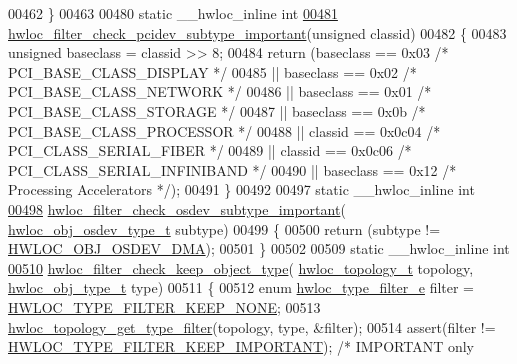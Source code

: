 \begin{DoxyCode}
{00462 \}
00463 
00480 \textcolor{keyword}{static} \_\_hwloc\_inline \textcolor{keywordtype}{int}
\hyperlink{a00231_ga60203db6459ebf275bf48c40a37661a0}{00481} \hyperlink{a00231_ga60203db6459ebf275bf48c40a37661a0}{hwloc\_filter\_check\_pcidev\_subtype\_important}(\textcolor{keywordtype}{unsigned} classid)
00482 \{
00483   \textcolor{keywordtype}{unsigned} baseclass = classid >> 8;
00484   \textcolor{keywordflow}{return} (baseclass == 0x03 \textcolor{comment}{/* PCI\_BASE\_CLASS\_DISPLAY */}
00485           || baseclass == 0x02 \textcolor{comment}{/* PCI\_BASE\_CLASS\_NETWORK */}
00486           || baseclass == 0x01 \textcolor{comment}{/* PCI\_BASE\_CLASS\_STORAGE */}
00487           || baseclass == 0x0b \textcolor{comment}{/* PCI\_BASE\_CLASS\_PROCESSOR */}
00488           || classid == 0x0c04 \textcolor{comment}{/* PCI\_CLASS\_SERIAL\_FIBER */}
00489           || classid == 0x0c06 \textcolor{comment}{/* PCI\_CLASS\_SERIAL\_INFINIBAND */}
00490           || baseclass == 0x12 \textcolor{comment}{/* Processing Accelerators */});
00491 \}
00492 
00497 \textcolor{keyword}{static} \_\_hwloc\_inline \textcolor{keywordtype}{int}
\hyperlink{a00231_gac7d57a6d669820f360cf2a070a396560}{00498} \hyperlink{a00231_gac7d57a6d669820f360cf2a070a396560}{hwloc\_filter\_check\_osdev\_subtype\_important}(
      \hyperlink{a00184_ga90c1e82a60ba5871d07645169e636987}{hwloc\_obj\_osdev\_type\_t} subtype)
00499 \{
00500   \textcolor{keywordflow}{return} (subtype != \hyperlink{a00184_gga64f5d539df299c97ae80ce53fc4b56c0a827ad1643360711a8b6c6af671366791}{HWLOC\_OBJ\_OSDEV\_DMA});
00501 \}
00502 
00509 \textcolor{keyword}{static} \_\_hwloc\_inline \textcolor{keywordtype}{int}
\hyperlink{a00231_ga2f402a43025a8a91e8513be1a15e4635}{00510} \hyperlink{a00231_ga2f402a43025a8a91e8513be1a15e4635}{hwloc\_filter\_check\_keep\_object\_type}(
      \hyperlink{a00186_ga9d1e76ee15a7dee158b786c30b6a6e38}{hwloc\_topology\_t} topology, \hyperlink{a00184_gacd37bb612667dc437d66bfb175a8dc55}{hwloc\_obj\_type\_t} type)
00511 \{
00512   \textcolor{keyword}{enum} \hyperlink{a00193_ga9a5a1f0140cd1952544477833733195b}{hwloc\_type\_filter\_e} filter = 
      \hyperlink{a00193_gga9a5a1f0140cd1952544477833733195ba4f835955414de92c77d99b8419d4647a}{HWLOC\_TYPE\_FILTER\_KEEP\_NONE};
00513   \hyperlink{a00193_ga137ad1178f7a79f2383974d983083401}{hwloc\_topology\_get\_type\_filter}(topology, type, &filter);
00514   assert(filter != \hyperlink{a00193_gga9a5a1f0140cd1952544477833733195ba63fd24954e18c83ff7eae9588759adb5}{HWLOC\_TYPE\_FILTER\_KEEP\_IMPORTANT}); \textcolor{comment}{/* IMPORTANT only
}}
\end{DoxyCode}
